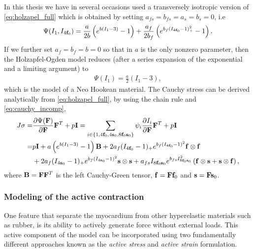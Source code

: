 In this thesis we have in several occasions used a
transversely isotropic version of \eqref{eq:holzapel_full} which is
obtained by setting $a_{fs} = b_{fs}= a_s = b_s = 0$, i.e
\begin{align}
  \label{eq:holzapel_trans}
  \begin{split}
  \Psi(I_1, I_{4\mathbf{f}_0}) = \frac{a}{2 b} \left( e^{ b (I_1 - 3)}  -1 \right)
  + \frac{a_f}{2 b_f} \left( e^{ b_f (I_{4\mathbf{f}_0} - 1)_+^2} -1 \right).
  \end{split}
\end{align}
If we further set $a_f = b_f = b = 0$ so that in $a$ is the
only nonzero parameter, then the Holzapfel-Ogden model reduces (after a
series expansion of the exponential and a limiting argument) to
\begin{align}
  \Psi(I_1)  = \frac{a}{2} \left( I_1 - 3 \right), 
\end{align}
which is the model of a Neo Hookean material. The Cauchy stress can be derived
analytically from \eqref{eq:holzapel_full}, by using the chain rule and
\eqref{eq:cauchy_incomp}, 
\begin{align}
  \begin{split}
    J\mathbf{\sigma}
    =& \frac{\partial \Psi(\mathbf{F})}{\partial \mathbf{F}}\mathbf{F}^{T} + p \mathbf{I}
    = \sum_{i \in \left\{ 1, 4\mathbf{f}_0,  4\mathbf{s}_0,  8\mathbf{f}_0\mathbf{s}_0 \right\} }
    \psi_i \frac{\partial I_i}{\partial \mathbf{F}}\mathbf{F}^{T} + p \mathbf{I} \\
    =& p \mathbf{I} + a \left( e^{ b (I_1 - 3)}  -1 \right) \mathbf{B} 
    + 2 a_f (I_{4\mathbf{f}_0} - 1)_+  e^{ b_f (I_{4\mathbf{f}_0} - 1)^2} \mathbf{f} \otimes \mathbf{f} \\
    &+ 2 a_f (I_{4\mathbf{s}_0} - 1)_+  e^{ b_f (I_{4\mathbf{s}_0} - 1)^2} \mathbf{s} \otimes \mathbf{s} 
    + a_{fs} I_{8\mathbf{f}_0\mathbf{s}_0}  e^{ b_{fs} I_{8\mathbf{f}_0\mathbf{s}_0}^2} \left( \mathbf{f} \otimes \mathbf{s}  +  \mathbf{s} \otimes \mathbf{f} \right),
  \end{split}
\end{align}
where $\mathbf{B} = \mathbf{F} \mathbf{F}^{T}$ is the left Cauchy-Green tensor,
$\mathbf{f} = \mathbf{F} \mathbf{f}_0$ and $\mathbf{s} = \mathbf{F} \mathbf{s}_0$.

\subsubsection{Modeling of the active contraction}
  

One feature that separate the myocardium from other hyperelastic
materials such as rubber, is its ability to actively generate force
without external loads. This active component of the model can be
incorporated using two fundamentally different approaches known as the
\emph{active stress} and \emph{active strain} formulation.



